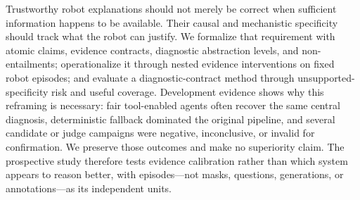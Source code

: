 \documentclass[conference]{IEEEtran}
\begin{document}
Trustworthy robot explanations should not merely be correct when sufficient information happens to
be available. Their causal and mechanistic specificity should track what the robot can justify.
We formalize that requirement with atomic claims, evidence contracts, diagnostic abstraction
levels, and non-entailments; operationalize it through nested evidence interventions on fixed robot
episodes; and evaluate a diagnostic-contract method through unsupported-specificity risk and
useful coverage. Development evidence shows why this reframing is necessary: fair tool-enabled
agents often recover the same central diagnosis, deterministic fallback dominated the original
pipeline, and several candidate or judge campaigns were negative, inconclusive, or invalid for
confirmation. We preserve those outcomes and make no superiority claim. The prospective study
therefore tests evidence calibration rather than which system appears to reason better, with
episodes---not masks, questions, generations, or annotations---as its independent units.

\balance


\end{document}
